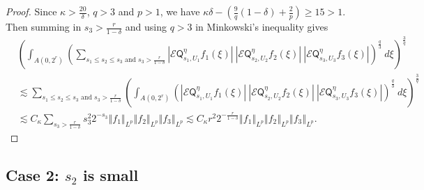 \documentclass{amsart}%
\theoremstyle{plain}
\numberwithin{equation}{section}
\begin{document}
\begin{proof}
Since $\kappa>\frac{20}{\delta}$, $q>3$ and $p>1$, we have $\kappa
\delta-\left(  \frac{9}{q}\left(  1-\delta\right)  +\frac{2}{p}\right)
\geq15>1$. Then summing in $s_{3}>\frac{r}{1-\delta}$ and using $q>3$ in
Minkowski's inequality gives
\begin{align}
&  \left(  \int_{A\left(  0,2^{r}\right)  }\left(  \sum_{s_{1}\leq s_{2}\leq
s_{3}\text{ and }s_{3}>\frac{r}{1-\delta}}\left\vert \mathcal{E}%
\mathsf{Q}_{s_{1},U_{1}}^{\eta}f_{1}\left(  \xi\right)  \right\vert
\ \left\vert \mathcal{E}\mathsf{Q}_{s_{2},U_{2}}^{\eta}f_{2}\left(
\xi\right)  \right\vert \ \left\vert \mathcal{E}\mathsf{Q}_{s_{3},U_{3}}%
^{\eta}f_{3}\left(  \xi\right)  \right\vert \right)  ^{\frac{q}{3}}%
\ d\xi\right)  ^{\frac{3}{q}}\label{first half}\\
&  \lesssim\sum_{s_{1}\leq s_{2}\leq s_{3}\text{ and }s_{3}>\frac{r}{1-\delta
}}\left(  \int_{A\left(  0,2^{r}\right)  }\left(  \left\vert \mathcal{E}%
\mathsf{Q}_{s_{1},U_{1}}^{\eta}f_{1}\left(  \xi\right)  \right\vert
\ \left\vert \mathcal{E}\mathsf{Q}_{s_{2},U_{2}}^{\eta}f_{2}\left(
\xi\right)  \right\vert \ \left\vert \mathcal{E}\mathsf{Q}_{s_{3},U_{3}}%
^{\eta}f_{3}\left(  \xi\right)  \right\vert \right)  ^{\frac{q}{3}}%
\ d\xi\right)  ^{\frac{3}{q}}\nonumber\\
&  \lesssim C_{\kappa}\sum_{s_{3}>\frac{r}{1-\delta}}s_{3}^{2}2^{-s_{3}%
}\left\Vert f_{1}\right\Vert _{L^{p}}\left\Vert f_{2}\right\Vert _{L^{p}%
}\left\Vert f_{3}\right\Vert _{L^{p}}\lesssim C_{\kappa}r^{2}2^{-\frac
{r}{1-\delta}}\left\Vert f_{1}\right\Vert _{L^{p}}\left\Vert f_{2}\right\Vert
_{L^{p}}\left\Vert f_{3}\right\Vert _{L^{p}}.\nonumber
\end{align}

\end{proof}

\subsection{Case 2: $s_{2}$ is small}
\end{document}
